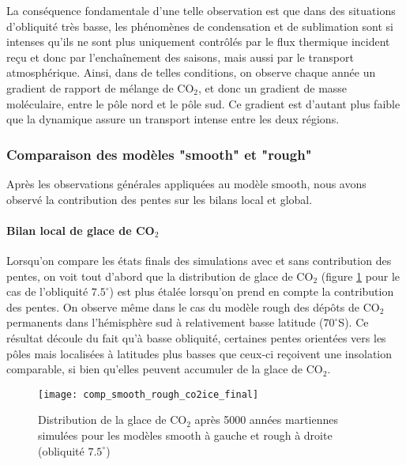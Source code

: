 \documentclass[11pt,a4paper]{article}
\begin{document}
La conséquence fondamentale d'une telle observation est que dans des situations d'obliquité très basse, les phénomènes de condensation et de sublimation sont si intenses qu'ils ne sont plus uniquement contrôlés par le flux  thermique incident reçu et donc par l'enchaînement des saisons, mais aussi par le transport atmosphérique. Ainsi, dans de telles conditions, on observe chaque année un gradient de rapport de mélange de CO$_2$, et donc un gradient de masse moléculaire, entre le pôle nord et le pôle sud. Ce gradient est d'autant plus faible que la dynamique assure un transport intense entre les deux régions. \\


\subsubsection{Comparaison des modèles "smooth" et "rough"}
Après les observations générales appliquées au modèle smooth, nous avons observé la contribution des pentes sur les bilans local et global.

\paragraph{Bilan local de glace de CO$_2$ \\}
Lorsqu'on compare les états finals des simulations avec et sans contribution des pentes, on voit tout d'abord que la distribution de glace de CO$_2$ (figure \ref{comp_smooth_rough_co2ice_final} pour le cas de l'obliquité $7.5^\circ$) est plus étalée lorsqu'on prend en compte la contribution des pentes. On observe même dans le cas du modèle rough des dépôts de CO$_2$ permanents dans l'hémisphère sud à relativement basse latitude ($70^\circ $S). Ce résultat découle du fait qu'à basse obliquité, certaines pentes orientées vers les pôles mais localisées à latitudes plus basses que ceux-ci reçoivent une insolation comparable, si bien qu'elles peuvent accumuler de la glace de CO$_2$. \\

\begin{figure}[h!]
\begin{center}
\texttt{[image: comp\_smooth\_rough\_co2ice\_final]}
\caption{Distribution de la glace de CO$_2$ après 5000 années martiennes simulées pour les modèles smooth à gauche et rough à droite (obliquité $7.5^\circ$)}
\label{comp_smooth_rough_co2ice_final}
\end{center}
\end{figure}
\end{document}
